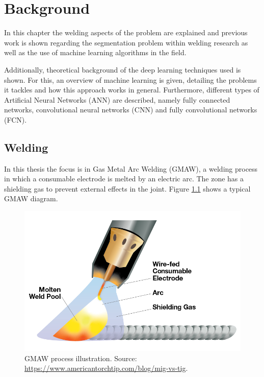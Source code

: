 \chapter{Background}\label{chap:background}

In this chapter the welding aspects of the problem are explained and previous work is shown regarding the segmentation problem within welding research as well as the use of machine learning algorithms in the field.

Additionally, theoretical background of the deep learning techniques used is shown. For this, an overview of machine learning is given, detailing the problems it tackles and how this approach works in general. Furthermore, different types of Artificial Neural Networks (ANN) are described, namely fully connected networks, convolutional neural networks (CNN) and fully convolutional networks (FCN). 

\section{Welding}

In this thesis the focus is in Gas Metal Arc Welding (GMAW), a welding process in which a consumable electrode is melted by an electric arc. The zone has a shielding gas to prevent external effects in the joint. Figure \ref{fig:gmaw} shows a typical GMAW diagram.

\begin{figure}
    \centering
    \includegraphics[scale=0.55]{Images/Background/gmaw.png}
    \caption[Illustration of a GMAW process]{GMAW process illustration. Source: \url{https://www.americantorchtip.com/blog/mig-vs-tig}.}
    \label{fig:gmaw}
\end{figure}

